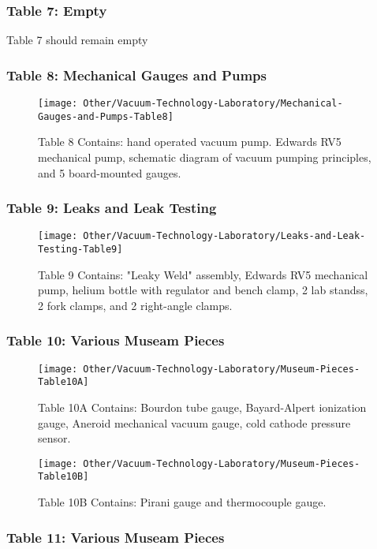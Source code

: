 \documentclass{book}
\begin{document}
\subsubsection{Table 7: Empty }
Table 7 should remain empty

\subsubsection{Table 8: Mechanical Gauges and Pumps}

\begin{figure}[H]
\texttt{[image: Other/Vacuum-Technology-Laboratory/Mechanical-Gauges-and-Pumps-Table8]}
\caption[align=left]{Table 8 Contains: hand operated vacuum pump. Edwards RV5 mechanical pump, schematic diagram of vacuum pumping principles, and 5 board-mounted gauges.}
\end{figure}

\subsubsection{Table 9: Leaks and Leak Testing}

\begin{figure}[H]
\texttt{[image: Other/Vacuum-Technology-Laboratory/Leaks-and-Leak-Testing-Table9]}
\caption[align=left]{Table 9 Contains: "Leaky Weld" assembly, Edwards RV5 mechanical pump, helium bottle with regulator and bench clamp, 2 lab standss, 2 fork clamps, and 2 right-angle clamps.}
\end{figure}

\subsubsection{Table 10: Various Museam Pieces}

\begin{figure}[H]
\texttt{[image: Other/Vacuum-Technology-Laboratory/Museum-Pieces-Table10A]}
\caption[align=left]{Table 10A Contains: Bourdon tube gauge, Bayard-Alpert ionization gauge, Aneroid mechanical vacuum gauge, cold cathode pressure sensor.}
\end{figure}

\begin{figure}[H]
\texttt{[image: Other/Vacuum-Technology-Laboratory/Museum-Pieces-Table10B]}
\caption[align=left]{Table 10B Contains: Pirani gauge and thermocouple gauge.}
\end{figure}

\subsubsection{Table 11: Various Museam Pieces}
\end{document}
